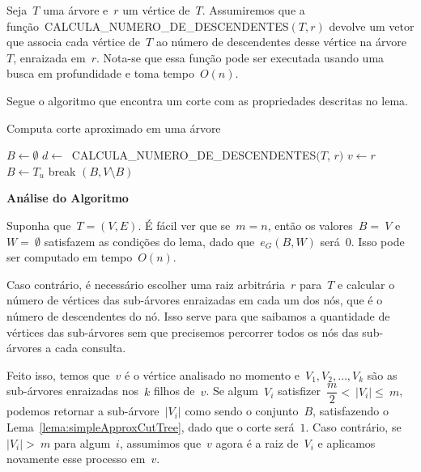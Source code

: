 \documentclass[a4paper,12pt]{article}
\begin{document}
\bigskip

Seja~$T$ uma árvore e~$r$ um vértice de~$T$. 
Assumiremos que
a função~CALCULA\_NUMERO\_DE\_DESCENDENTES$(T,r)$ devolve um vetor
que associa cada vértice de~$T$ ao número de descendentes desse 
vértice na árvore~$T$, enraizada em~$r$. Nota-se que essa função 
pode ser executada usando uma busca em profundidade e toma 
tempo~$O(n)$.


Segue o algoritmo que encontra um corte com as propriedades 
descritas no lema.

\medskip

\begin{algorithm}[H]
\label{alg:simpleApproxCutTree}

	\caption{Computa corte aproximado em uma árvore}
	$B \gets \emptyset$\;
	{
		$d \gets~$ CALCULA\_NUMERO\_DE\_DESCENDENTES$(T$, $r)$\;
		$v \gets r$\;
		{
			$B\gets T_u$\;  
		}
		{
		{
			{
				break\;
			}
		}
		}
	}
	\Return $(B,V\setminus B)$

\end{algorithm}	

\bigskip
\bigskip
\bigskip

\textbf{Análise do Algoritmo}

	Suponha que~$T=(V,E)$.
	É fácil ver que se~$m=n$, então os valores~$B =~V$ 
	e~$W =~\emptyset$ satisfazem as condições do lema, dado 
	que~$e_G(B,W)$ será~$0$. 
	Isso pode ser computado em tempo~$O(n)$.

	Caso contrário, é necessário escolher uma raiz arbitrária~$r$ 
	para~$T$ e calcular o número de vértices das sub-árvores 
	enraizadas em cada um dos nós, que é o número de descendentes 
	do nó.
	Isso serve para que saibamos a quantidade de vértices das 
	sub-árvores sem que precisemos percorrer todos os nós das 
	sub-árvores a cada consulta.

	Feito isso, temos que~$v$ é o vértice analisado no momento 
	e~$V_1, V_2, \ldots, V_k$ são as sub-árvores enraizadas 
	nos~$k$ filhos de~$v$.
	Se algum~$V_i$ satisfizer~$\dfrac{m}{2}<~|V_i|\le~m$, podemos 
	retornar a sub-árvore~$|V_i|$ como sendo o conjunto~$B$, 
	satisfazendo o Lema~\ref{lema:simpleApproxCutTree}, dado que o 
	corte será~$1$.
	Caso contrário, se~$|V_i|>~m$ para algum~$i$, assumimos 
	que~$v$ agora é a raiz de~$V_i$ e aplicamos novamente esse 
	processo em~$v$.
\end{document}
